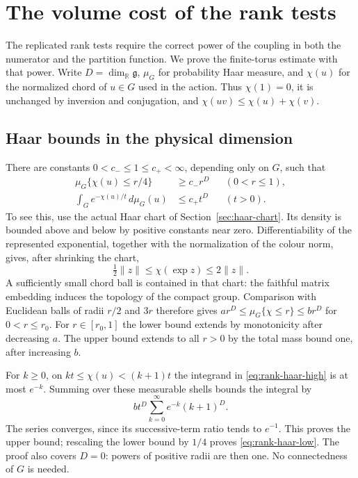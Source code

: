 \section{The volume cost of the rank tests}
\label{sec:rank-root-normalization}

The replicated rank tests require the correct power of the coupling in
both the numerator and the partition function. We prove the finite-torus
estimate with that power. Write $D=\dim_{\mathbb R}\mathfrak g$, $\mu_G$
for probability Haar measure, and $\chi(u)$ for the normalized chord of
$u\in G$ used in the action. Thus $\chi(1)=0$, it is unchanged by
inversion and conjugation, and $\chi(uv)\le\chi(u)+\chi(v)$.

\subsection{Haar bounds in the physical dimension}

There are constants $0<c_-\le1\le c_+<\infty$, depending only on $G$,
such that
\begin{align}
 \mu_G\{\chi(u)\le r/4\}&\ge c_-r^D &&(0<r\le1),
       \label{eq:rank-haar-low}\\
 \int_G e^{-\chi(u)/t}\,d\mu_G(u)&\le c_+t^D &&(t>0).
       \label{eq:rank-haar-high}
\end{align}
To see this, use the actual Haar chart of Section~\ref{sec:haar-chart}.
Its density is bounded above and below by positive constants near zero.
Differentiability of the represented exponential, together with the
normalization of the colour norm, gives, after shrinking the chart,
\[
 \tfrac12\|z\|\le\chi(\exp z)\le2\|z\|.
\]
A sufficiently small chord ball is contained in that chart: the faithful
matrix embedding induces the topology of the compact group. Comparison
with Euclidean balls of radii $r/2$ and $3r$ therefore gives
$a r^D\le\mu_G\{\chi\le r\}\le b r^D$ for $0<r\le r_0$.
For $r\in[r_0,1]$ the lower bound extends by monotonicity after decreasing
$a$. The upper bound extends to all $r>0$ by the total mass bound one,
after increasing $b$.

For $k\ge0$, on $kt\le\chi(u)<(k+1)t$ the integrand in
\eqref{eq:rank-haar-high} is at most $e^{-k}$. Summing over these
measurable shells bounds the integral by
\[
 b t^D\sum_{k=0}^\infty e^{-k}(k+1)^D.
\]
The series converges, since its successive-term ratio tends to $e^{-1}$.
This proves the upper bound; rescaling the lower bound by $1/4$ proves
\eqref{eq:rank-haar-low}. The proof also covers $D=0$: powers of positive
radii are then one. No connectedness of $G$ is needed.

